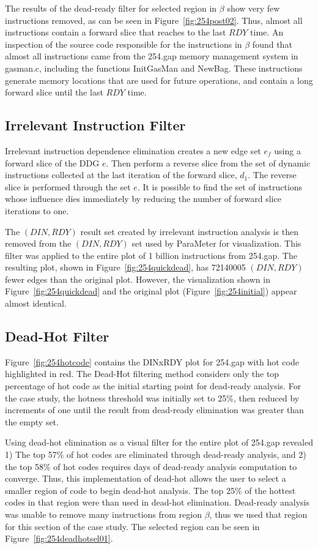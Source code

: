 {The results of the dead-ready filter for selected region in $\beta$ show very few instructions removed, as can be seen in Figure~\ref{fig:254post02}. Thus, almost all instructions contain a forward slice that reaches to the last $RDY$ time.  An inspection of the source code responsible for the instructions in $\beta$ found that almost all instructions came from the 254.gap memory management system in gasman.c, including the functions InitGasMan and NewBag.  These instructions generate memory locations that are used for future operations, and contain a long forward slice until the last $RDY$ time.

\subsection {Irrelevant Instruction Filter}

Irrelevant instruction dependence elimination creates a new edge set $e_f$ using a forward slice of the DDG $e$.  Then perform a reverse slice from the set of dynamic instructions collected at the last iteration of the forward slice, $d_1$.  The reverse slice is performed through the set $e$.  It is possible to find the set of instructions whose influence dies immediately by reducing the number of forward slice iterations to one.

The $(DIN,RDY)$ result set created by irrelevant instruction analysis is then removed from the $(DIN,RDY)$ set used by ParaMeter for visualization. This filter was applied to the entire plot of 1 billion instructions from 254.gap.  The resulting plot, shown in Figure~\ref{fig:254quickdead}, has 72140005 $(DIN,RDY)$ fewer edges than the original plot.  However, the visualization shown in Figure~\ref{fig:254quickdead} and the original plot (Figure~\ref{fig:254initial}) appear almost identical.

\subsection {Dead-Hot Filter}

Figure~\ref{fig:254hotcode} contains the DINxRDY plot for 254.gap with hot code highlighted in red.  The Dead-Hot filtering method considers only the top percentage of hot code as the initial starting point for dead-ready analysis. For the case study, the hotness threshold was initially set to 25\%, then reduced by increments of one until the result from dead-ready elimination was greater than the empty set.

Using dead-hot elimination as a visual filter for the entire plot of 254.gap revealed 1) The top 57\% of hot codes are eliminated through dead-ready analysis, and 2) the top 58\% of hot codes requires days of dead-ready analysis computation to converge.  Thus, this implementation of dead-hot allows the user to select a smaller region of code to begin dead-hot analysis.  The top 25\% of the hottest codes in that region were than used in dead-hot elimination.  Dead-ready analysis was unable to remove many instructions from region $\beta$, thus we used that region for this section of the case study.  The selected region can be seen in Figure~\ref{fig:254deadhotsel01}.

}
